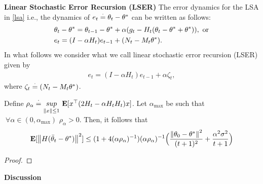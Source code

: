 \textbf{Linear Stochastic Error Recursion (LSER)} The error dynamics for the LSA in \eqref{lsa} i.e., the dynamics of $e_t\eqdef\theta_t-\ts$ can be written as follows:
\begin{align}\label{errprelim}
&\theta_t-\ts=\theta_{t-1}-\ts+\alpha(g_t -H_t(\theta_t-\ts+\ts)),\text{~or}\nn\\
&e_t=(I-\alpha H_t)e_{t-1}+(N_t-M_t\ts).
\end{align}
In what follows we consider what we call linear stochastic error recursion (LSER) given by
\begin{align}\label{lsergen}
e_t=(I-\alpha H_t)e_{t-1}+\alpha \zeta_t,
\end{align}
where $\zeta_t\eqdef (N_t-M_t\ts)$.
\begin{theorem}\label{maintheorem}
Define $\rho_\alpha\eqdef \us{sup}{\norm{x}\leq 1}\E[x^\top (2H_t-\alpha H_tH_t)x]$. Let $\alpha_{\max}$ be such that $~\forall \alpha\in(0,\alpha_{\max})$ $\rho_{\alpha}>0$. Then, it follows that
\begin{align}
\E[\norm{H(\tb_t-\ts)}^2]\leq (1+4(\alpha\rho_{\alpha})^{-1}) (\alpha\rho_{\alpha})^{-1} \Big(\frac{\norm{\theta_0-\ts}^2}{(t+1)^2}+\frac{\alpha^2\sigma^2}{t+1} \Big)
\end{align}
\end{theorem}
\begin{proof}
\end{proof}
\textbf{Discussion}
